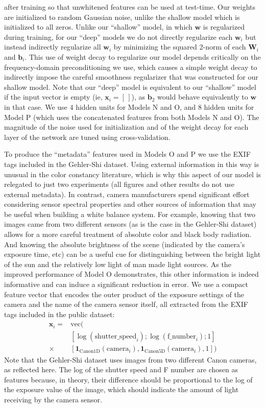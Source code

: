 \documentclass[10pt,twocolumn,letterpaper]{article}
\begin{document}
after training so that unwhitened features can be used at test-time.
%
Our weights are initialized to random Gaussian noise, unlike the shallow model
which is initialized to all zeros.
%
Unlike our ``shallow'' model, in which $\mathbf{w}$ is regularized during training,
for our ``deep'' models we do not directly regularize each $\mathbf{w}_i$ but instead
indirectly regularize all $\mathbf{w}_i$ by minimizing the squared 2-norm of each $\mathbf{W}_i$ and $\mathbf{b}_i$.
%
This use of weight decay to regularize our model depends critically on the
frequency-domain preconditioning we use, which causes a simple weight decay to
indirectly impose the careful smoothness regularizer that was constructed for our shallow model.
%
Note that our ``deep'' model is equivalent to our ``shallow'' model if the input vector is empty
(ie, $\mathbf{x}_i = [\,]$), as $\mathbf{b}_2$ would behave equivalently to $\mathbf{w}$ in that case.
%
We use $4$ hidden units for Models N and O, and $8$ hidden units for Model P
(which uses the concatenated features from both Models N and O).
%
The magnitude of the noise used for initialization and of the weight decay for
each layer of the network are tuned using cross-validation.

To produce the ``metadata'' features used in Models O and P we use the EXIF tags
included in the Gehler-Shi dataset.
%
Using external information in this way is unusual in the color constancy
literature, which is why this aspect of our model is relegated to just two
experiments (all figures and other results do not use external metadata).
%
In contrast, camera manufacturers spend significant effort considering sensor
spectral properties and other sources of information that may be useful when
building a white balance system.
%
For example, knowing that two images came from two different sensors (as is the
case in the Gehler-Shi dataset) allows for a more careful treatment of absolute
color and black body radiation.
%
And knowing the absolute brightness of the scene (indicated by the camera's
exposure time, etc) can be a useful cue for distinguishing between the bright
light of the sun and the relatively low light of man made light sources.
%
As the improved performance of Model O demonstrates, this other information is
indeed informative and can induce a significant reduction in error.
%
We use a compact feature vector that encodes the outer product of the
exposure settings of the camera and the name of the camera sensor itself, all
extracted from the EXIF tags included in the public dataset:
\begin{align}
\mathbf{x}_i =&  \mathrm {vec} ( \\
& [\log(\mathrm{shutter\_speed}_i); \log(\mathrm{f\_number}_i); 1] \nonumber \\
\times & [\mathbf {1}_{\mathrm{Canon1D}} (\mathrm{camera}_i), \mathbf {1}_{\mathrm{Canon5D}} (\mathrm{camera}_i), 1]) \nonumber
\end{align}
Note that the Gehler-Shi dataset uses images from two different Canon cameras,
as reflected here.
%
The log of the shutter speed and F number are chosen as features because,
in theory, their difference should be proportional to the log of the exposure
value of the image, which should indicate the amount of light receiving by the
camera sensor.
\end{document}
